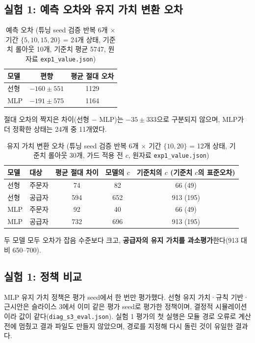 \documentclass[11pt,a4paper]{article}
\begin{document}
\subsection{실험 1: 예측 오차와 유지 가치 변환 오차}

\begin{table}[H]
\centering\small
\caption{예측 오차 (튜닝 seed 검증 반복 6개 $\times$ 기간 $\{5,10,15,20\}$ = 24개 상태, 기준치 롤아웃 10개, 기준치 평균 5747, 원자료 \texttt{exp1\_value.json})}\label{tab:pred}
\begin{tabular}{lcc}
\toprule
모델 & 편향 & 평균 절대 오차\\
\midrule
선형 & $-160\pm551$ & 1129\\
MLP & $-191\pm575$ & 1164\\
\bottomrule
\end{tabular}
\end{table}

절대 오차의 짝지은 차이(선형 $-$ MLP)는 $-35\pm333$으로 구분되지 않으며,
MLP가 더 정확한 상태는 24개 중 11개였다.

\begin{table}[H]
\centering\small
\caption{유지 가치 변환 오차 (튜닝 seed 검증 반복 6개 $\times$ 기간 $\{10,20\}$ = 12개 상태, 기준치 롤아웃 30개, 가드 적용 전 $c$, 원자료 \texttt{exp1\_value.json})}\label{tab:conv}
\begin{tabular}{llccc}
\toprule
모델 & 대상 & 평균 절대 차이 & 모델의 $c$ & 기준치의 $c$ (기준치 $c$의 표준오차)\\
\midrule
선형 & 주문자 & 74 & 82 & 66 (49)\\
선형 & 공급자 & 594 & 652 & 913 (195)\\
MLP & 주문자 & 92 & 40 & 66 (49)\\
MLP & 공급자 & 732 & 696 & 913 (195)\\
\bottomrule
\end{tabular}
\end{table}

두 모델 모두 오차가 잡음 수준보다 크고, \textbf{공급자의 유지 가치를 과소평가}한다(913 대비 650--700).

\subsection{실험 1: 정책 비교}

MLP 유지 가치 정책은 평가 seed에서 한 번만 평가했다. 선형 유지 가치·규칙 기반·근시안은 슬라이스 3에서 이미
같은 평가 seed로 평가한 정책이며, 결정적 시뮬레이션이라 값이 같다(\texttt{diag\_s3\_eval.json}).
실험 1 평가의 첫 실행은 모듈 경로 오류로 계산 전에 멈췄고 결과 파일도 만들지 않았으며,
경로를 지정해 다시 돌린 것이 유일한 결과다.
\end{document}
